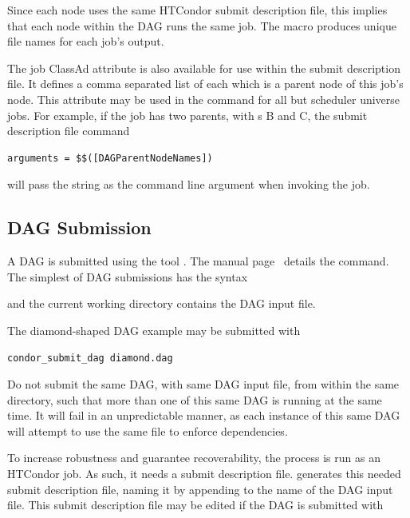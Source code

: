 Since each node uses the same HTCondor submit description file,
this implies that each node within the DAG runs the
same job.
The  macro
produces unique file names for each job's output.

The job ClassAd attribute  is also available
for use within the submit description file. 
It defines a comma separated list of each 
which is a parent node of this job's node.
This attribute may be used in the  command
for all but scheduler universe jobs.
For example, if the job has two parents, with s B and C,
the submit description file command
\begin{verbatim}
arguments = $$([DAGParentNodeNames])
\end{verbatim}
will pass the string  as the command line argument when invoking
the job.

\subsection{\label{dagman:submitdag}DAG Submission}

A DAG is submitted using the tool .
The manual
page~\pageref{man-condor-submit-dag}
details the command.
The simplest of DAG submissions has the syntax

 

and the current working directory contains the DAG input file.

The diamond-shaped DAG example may be submitted with

\begin{verbatim}
condor_submit_dag diamond.dag
\end{verbatim}

Do not submit the same DAG, with same DAG input file, 
from within the same directory, 
such that more than one of this same DAG is running at the same time.
It will fail in an unpredictable manner,
as each instance of this same DAG will attempt to use the same
file to enforce dependencies.
 
To increase robustness and guarantee recoverability, the 
 process is run as an HTCondor job.
As such, it needs a submit description file.
 generates this needed submit description file,
naming it by appending  to the name of the DAG input file.
This submit description file may be edited if the DAG is submitted with

